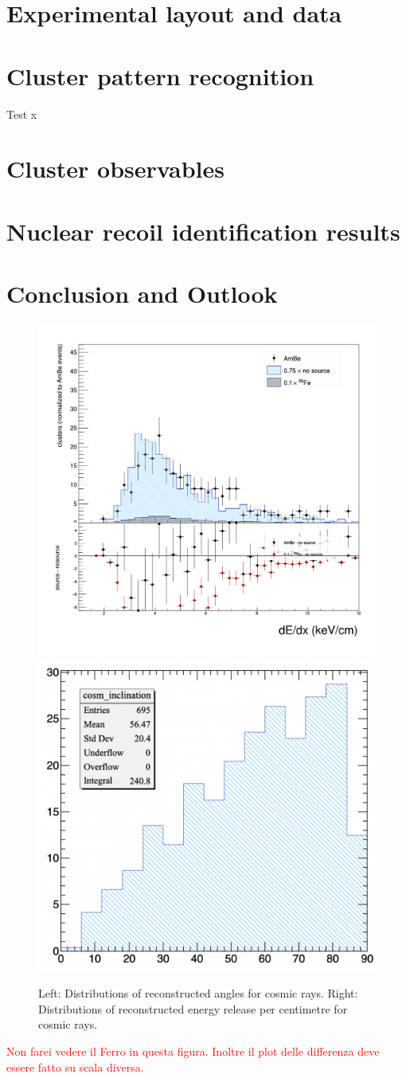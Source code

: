 \documentclass[12pt]{iopart}
\begin{document}
 
 \section{Experimental layout and data }
 
 
 \section{Cluster pattern recognition}
 
 Test x
 
 \section{Cluster observables}
 
 \section{Nuclear recoil identification results}
 
 \section{Conclusion and Outlook}
 
 
\begin{figure}[ht]
	\centering
	\includegraphics[width=0.45\linewidth]{dEdx_cosmics.png}
	\includegraphics[width=0.45\linewidth]{cosmic_angle.png}
  	\caption{Left: Distributions of reconstructed angles for cosmic rays. Right: Distributions of reconstructed energy release per centimetre for cosmic rays.}
  	\label{fig:cosmics}
\end{figure}
\textcolor{red}{Non farei vedere il Ferro in questa figura. Inoltre il plot delle differenza deve essere fatto su scala diversa. }
\end{document}
